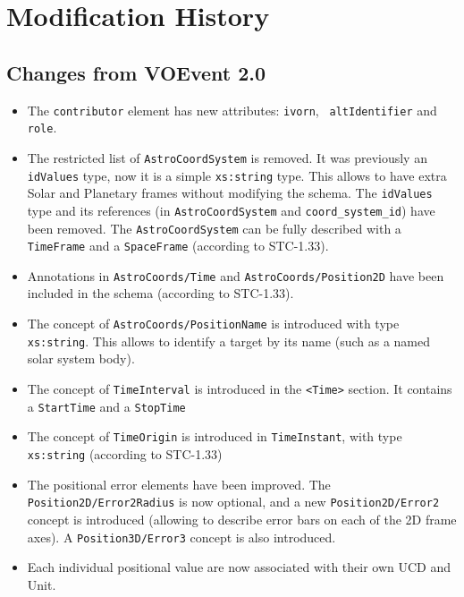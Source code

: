 \documentclass[11pt,a4paper]{ivoa}
\begin{document}


\appendix

\section{Modification History}
\subsection{Changes from VOEvent 2.0}
\label{appendix:last-changes}
\begin{itemize}
\item The {\tt contributor} element has new attributes: {\tt ivorn}, {\tt
altIdentifier} and {\tt role}.
\item The restricted list of {\tt AstroCoordSystem} is removed. It was
previously an {\tt idValues} type, now it is a simple {\tt xs:string} type.
This allows to have extra Solar and Planetary frames without modifying the
schema. The {\tt idValues} type and its references (in {\tt AstroCoordSystem}
and {\tt coord\_system\_id}) have been removed. The {\tt AstroCoordSystem} can
be fully described with a {\tt TimeFrame} and a {\tt SpaceFrame}  (according to
STC-1.33).
\item Annotations in {\tt AstroCoords/Time} and {\tt AstroCoords/Position2D}
have been included in the schema (according to STC-1.33).
\item The concept of {\tt AstroCoords/PositionName} is introduced with type {\tt
xs:string}. This allows to identify a target by its name (such as a named solar
system body).
\item The concept of {\tt TimeInterval} is introduced in the {\tt <Time>}
section. It contains a {\tt StartTime} and a {\tt StopTime}
\item The concept of {\tt TimeOrigin} is introduced in {\tt TimeInstant}, with
type {\tt xs:string} (according to STC-1.33)
\item The positional error elements have been improved. The {\tt
Position2D/Error2Radius} is now optional, and a new {\tt Position2D/Error2}
concept is introduced (allowing to describe error bars on each of the 2D frame
axes). A {\tt Position3D/Error3} concept is also introduced.
\item Each individual positional value are now associated with their own UCD
and Unit.
\end{itemize}
\end{document}
